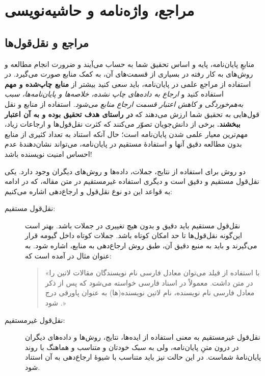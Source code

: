 \chapter{مراجع، واژه‌نامه و حاشیه‌نویسی}
\label{app:refMan}

\section{مراجع و نقل‌قول‌ها}
\label{sec:refUsage}
منابعِ پایان‌نامه، پایه و اساس تحقیق شما به حساب می‌آیند و ضرورت انجام مطالعه و روش‌های به کار رفته در بسیاری از قسمت‌های آن، به کمک منابع صورت می‌گیرد. در استفاده از مراجع علمی در پایان‌نامه، باید سعی کنید بیشتر از
\textbf{منابع چاپ‌شده و مهم}
استفاده کنید و
\emph{ارجاع به داده‌های چاپ نشده، خلاصه‌ها و پایان‌نامه‌ها، سبب به‌هم‌خوردگی و کاهش اعتبار قسمت ارجاع منابع می‌شود.}
استفاده از منابع و نقل قول‌هایی به تحقیق شما ارزش می‌دهند که
\textbf{در راستای هدف تحقیق بوده و به آن اعتبار ببخشند.}
برخی از دانش‌جویان تصوّر می‌کنند که کثرت نقل‌قول‌ها و ارجاعات زیاد، مهم‌ترین معیار علمی شدن پایان‌نامه است؛ حال آنکه استناد به تعداد کثیری از منابع بدون مطالعه دقیق آنها و استفادهٔ مستقیم در پایان‌نامه، می‌تواند نشان‌دهندهٔ عدم احساس امنیت نویسنده باشد!

دو روش برای استفاده از نتایج، جملات، داده‌ها و روش‌های دیگران وجود دارد. یکی نقل‌قول مستقیم و دقیق است و دیگری استفاده غیرمستقیم در متن مقاله، که در ادامه به قواعد این دو نوع نقل‌قول و ارجاع‌دهی اشاره می‌کنیم:
\begin{description}
	\item[نقل‌قول مستقیم:]
	نقل‌قول مستقیم باید دقیق و بدون هیچ تغییری در جملات باشد. بهتر است این‌گونه نقل‌قول‌ها تا حد امکان کوتاه باشد. جملات کوتاه داخل گیومه قرار می‌گیرند و باید به منبع دقیق آن، طبق روش ارجاع‌دهی به منابع، اشاره شود. به عنوان مثال در
	\cite{persianbib87userguide}
	آمده است که:
	\begin{quote}
		«با استفاده از فیلد
		می‌توان معادل فارسی نام نویسندگان مقالات لاتین را در متن داشت. معمولاً در اسناد فارسی خواسته می‌شود که پس از ذکر معادل فارسی نام نویسنده، نام لاتین نویسنده(ها) به عنوان پاورقی درج شود
		\citep{persianbib87userguide}.»
	\end{quote}
	\item[نقل‌قول غیرمستقیم:]
	نقل‌قول غیرمستقیم به معنی استفاده از ایده‌ها، نتایج، روش‌ها و داده‌های دیگران در درون متنِ پایان‌نامه، ولی به سبک خودتان و متناسب و هماهنگ با روند پایان‌نامهٔ شماست. در این حالت نیز باید متناسب با شیوهٔ ارجاع‌دهی به آن استناد شود.
\end{description}

